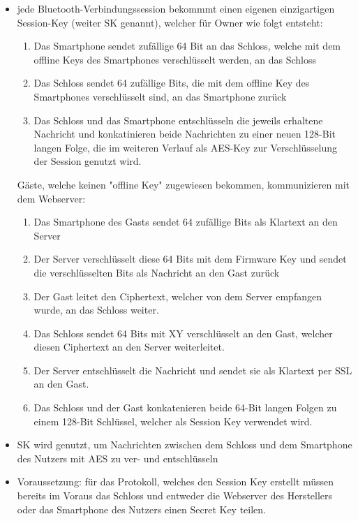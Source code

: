 		\begin{itemize}
		    \item jede Bluetooth-Verbindungssession bekommmt einen eigenen einzigartigen Session-Key (weiter SK genannt), welcher für Owner wie folgt entsteht:
		        \begin{enumerate}
		            \item Das Smartphone sendet zufällige 64 Bit an das Schloss, welche mit dem offline Keys des Smartphones verschlüsselt werden, an das Schloss
		            \item Das Schloss sendet 64 zufällige Bits, die mit dem offline Key des Smartphones verschlüsselt sind, an das Smartphone zurück
		            \item Das Schloss und das Smartphone entschlüsseln die jeweils erhaltene Nachricht und konkatinieren beide Nachrichten zu einer neuen 128-Bit langen Folge, die im weiteren Verlauf als AES-Key zur Verschlüsselung der Session genutzt wird.
		        \end{enumerate}
		        Gäste, welche keinen "offline Key" zugewiesen bekommen, kommunizieren mit dem Webserver:
		        \begin{enumerate}
		            \item Das Smartphone des Gasts sendet 64 zufällige Bits als Klartext an den Server
		            \item Der Server verschlüsselt diese 64 Bits mit dem Firmware Key und sendet die verschlüsselten Bits als Nachricht an den Gast zurück
		            \item Der Gast leitet den Ciphertext, welcher von dem Server empfangen wurde, an das Schloss weiter.
		            \item Das Schloss sendet 64 Bits mit XY  verschlüsselt an den Gast, welcher diesen Ciphertext an den Server weiterleitet.
		            \item Der Server entschlüsselt die Nachricht und sendet sie als Klartext per SSL an den Gast.
		            \item Das Schloss und der Gast konkatenieren beide 64-Bit langen Folgen zu einem 128-Bit Schlüssel, welcher als Session Key verwendet wird.
		        \end{enumerate}
		    \item SK wird genutzt, um Nachrichten zwischen dem Schloss und dem Smartphone des Nutzers mit AES zu ver- und entschlüsseln
		    \item Voraussetzung: für das Protokoll, welches den Session Key erstellt müssen bereits im Voraus das Schloss und entweder die Webserver des Herstellers oder das Smartphone des Nutzers einen Secret Key teilen.

\end{itemize}
